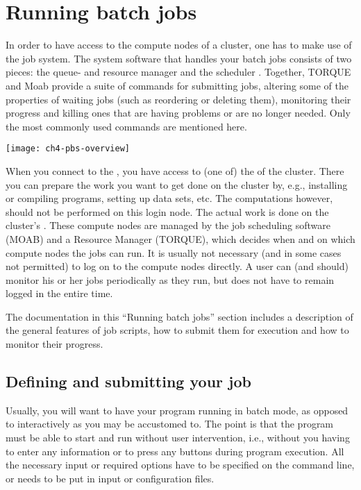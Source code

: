 \chapter{Running batch jobs}

In order to have access to the compute nodes of a cluster, one has to make use
of the job system. The system software that handles your batch jobs consists of
two pieces: the queue- and resource manager  and the scheduler
. Together, TORQUE and Moab provide a suite of commands for
submitting jobs, altering some of the properties of waiting jobs (such as
reordering or deleting them), monitoring their progress and killing ones that
are having problems or are no longer needed. Only the most commonly used
commands are mentioned here.

\texttt{[image: ch4-pbs-overview]}

When you connect to the \hpc, you have access to (one of) the  of the cluster. There you can prepare the work you want to get done on
the cluster by, e.g., installing or compiling programs, setting up data sets,
etc. The computations however, should not be performed on this login node. The
actual work is done on the cluster's . These compute
nodes are managed by the job scheduling software (MOAB) and a Resource Manager
(TORQUE), which decides when and on which compute nodes the jobs can run. It is
usually not necessary (and in some cases not permitted) to log on to the
compute nodes directly. A user can (and should) monitor his or her jobs
periodically as they run, but does not have to remain logged in the entire
time.

The documentation in this ``Running batch jobs'' section includes a description
of the general features of job scripts, how to submit them for execution and
how to monitor their progress.

\section{Defining and submitting your job}

Usually, you will want to have your program running in batch mode, as opposed
to interactively as you may be accustomed to. The point is that the program
must be able to start and run without user intervention, i.e., without you
having to enter any information or to press any buttons during program
execution. All the necessary input or required options have to be specified on
the command line, or needs to be put in input or configuration files.

